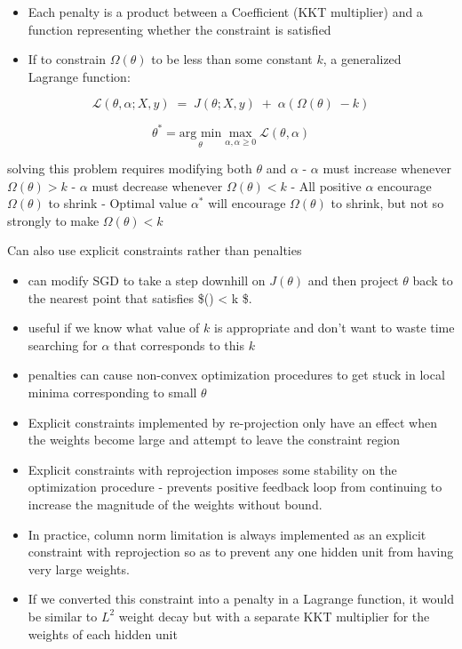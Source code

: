 \documentclass[11pt]{article}
\providecommand{\tightlist}{%
      \setlength{\itemsep}{0pt}\setlength{\parskip}{0pt}}
\begin{document}
    \begin{itemize}
\tightlist
\item
  Each penalty is a product between a Coefficient (KKT multiplier) and a
  function representing whether the constraint is satisfied
\end{itemize}

    \begin{itemize}
\tightlist
\item
  If to constrain \(\Omega(\theta)\) to be less than some constant
  \(k\), a generalized Lagrange function: 
\end{itemize}

\begin{equation*}
\mathcal{L}(\theta,\alpha;X,y)\; = \; J(\theta; X,y)\; + \; \alpha(\Omega(\theta)\; - k)
\end{equation*}

    \begin{equation*}
\theta^* = 
\underset{\theta}{\text{arg min}} \;
\underset{\alpha,\alpha \geq 0}{\text{max}}\;{\mathcal{L}(\theta,\alpha)}
\end{equation*}

    solving this problem requires modifying both \(\theta\) and \(\alpha\) -
\(\alpha\) must increase whenever \(\Omega(\theta) > k\) - \(\alpha\)
must decrease whenever \(\Omega(\theta) < k\) - All positive \(\alpha\)
encourage \(\Omega(\theta)\) to shrink - Optimal value \(\alpha^*\) will
encourage \(\Omega(\theta)\) to shrink, but not so strongly to make
\(\Omega(\theta) < k\)

    Can also use explicit constraints rather than penalties

    \begin{itemize}
\tightlist
\item
  can modify SGD to take a step downhill on \(J(\theta)\) and then
  project \(\theta\) back to the nearest point that satisfies
  \$\Omega(\theta) \textless{} k \$.
\item
  useful if we know what value of \(k\) is appropriate and don't want to
  waste time searching for \(\alpha\) that corresponds to this \(k\)
\item
  penalties can cause non-convex optimization procedures to get stuck in
  local minima corresponding to small \(\theta\)
\item
  Explicit constraints implemented by re-projection only have an effect
  when the weights become large and attempt to leave the constraint
  region
\item
  Explicit constraints with reprojection imposes some stability on the
  optimization procedure - prevents positive feedback loop from
  continuing to increase the magnitude of the weights without bound.
\item
  In practice, column norm limitation is always implemented as an
  explicit constraint with reprojection so as to prevent any one hidden
  unit from having very large weights.
\item
  If we converted this constraint into a penalty in a Lagrange function,
  it would be similar to \(L^2\) weight decay but with a separate KKT
  multiplier for the weights of each hidden unit
\end{itemize}
\end{document}
